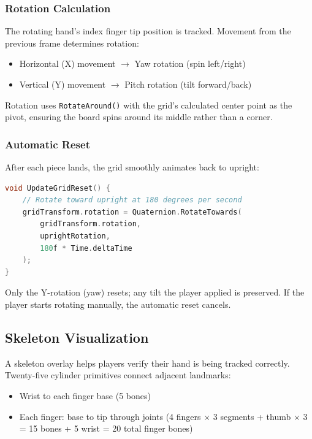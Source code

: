 \documentclass[11pt]{article}
\begin{document}
\subsubsection{Rotation Calculation}

The rotating hand's index finger tip position is tracked. Movement from the previous frame determines rotation:

\begin{itemize}
    \item Horizontal (X) movement $\rightarrow$ Yaw rotation (spin left/right)
    \item Vertical (Y) movement $\rightarrow$ Pitch rotation (tilt forward/back)
\end{itemize}

Rotation uses \texttt{RotateAround()} with the grid's calculated center point as the pivot, ensuring the board spins around its middle rather than a corner.

\subsubsection{Automatic Reset}

After each piece lands, the grid smoothly animates back to upright:

\begin{lstlisting}[language=C, caption=Grid Reset Animation]
void UpdateGridReset() {
    // Rotate toward upright at 180 degrees per second
    gridTransform.rotation = Quaternion.RotateTowards(
        gridTransform.rotation,
        uprightRotation,
        180f * Time.deltaTime
    );
}
\end{lstlisting}

Only the Y-rotation (yaw) resets; any tilt the player applied is preserved. If the player starts rotating manually, the automatic reset cancels.

\subsection{Skeleton Visualization}

A skeleton overlay helps players verify their hand is being tracked correctly. Twenty-five cylinder primitives connect adjacent landmarks:

\begin{itemize}
    \item Wrist to each finger base (5 bones)
    \item Each finger: base to tip through joints (4 fingers $\times$ 3 segments + thumb $\times$ 3 = 15 bones + 5 wrist = 20 total finger bones)
\end{itemize}
\end{document}
